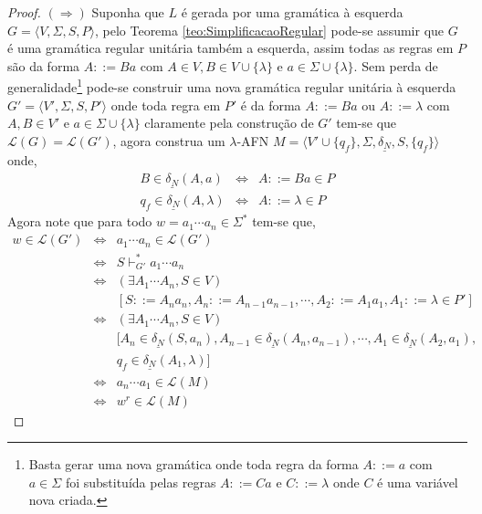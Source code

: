 \begin{proof}
	$(\Rightarrow)$ Suponha que $L$ é gerada por uma gramática à esquerda $G = \langle V, \Sigma, S, P \rangle$, pelo Teorema \ref{teo:SimplificacaoRegular} pode-se assumir que $G$ é uma gramática regular unitária também a esquerda, assim todas as regras em $P$ são da forma $A ::= Ba$ com $A \in V, B \in V \cup \{\lambda\}$ e $a \in \Sigma \cup \{\lambda\}$. Sem perda de generalidade\footnote{Basta gerar uma nova gramática onde toda regra da forma $A ::= a$ com $a \in \Sigma$ foi substituída pelas regras $A ::= Ca$ e $C ::= \lambda$ onde $C$ é uma variável nova criada.} pode-se construir uma nova gramática regular unitária à esquerda $G' = \langle V', \Sigma, S, P'\rangle$ onde toda regra em $P'$ é da forma $A ::= Ba$ ou $A ::= \lambda$ com $A, B \in V'$ e $a \in \Sigma \cup \{\lambda\}$ claramente pela construção de $G'$ tem-se que $\mathcal{L}(G) = \mathcal{L}(G')$, agora construa um $\lambda$-AFN $M = \langle V' \cup \{q_f\}, \Sigma, \underline{\delta_N}, S, \{q_f\} \rangle$ onde, 
	\begin{eqnarray*}
		B \in \underline{\delta_N}(A, a) & \Longleftrightarrow & A ::= Ba \in P\\
		q_f \in \underline{\delta_N}(A, \lambda)& \Longleftrightarrow & A ::= \lambda \in P
	\end{eqnarray*} 
	Agora note que para todo $w = a_1\cdots a_n \in \Sigma^*$ tem-se que,
	\begin{eqnarray*}
		w \in \mathcal{L}(G') & \Longleftrightarrow &  a_1\cdots a_n \in \mathcal{L}(G')\\
		& \Longleftrightarrow & S \vdash_{G'}^* a_1\cdots a_n\\
		& \Longleftrightarrow & (\exists A_1 \cdots A_n, S \in V)\\
		& & [S ::= A_na_n, A_n ::= A_{n-1}a_{n-1}, \cdots, A_{2} ::= A_1a_1, A_1 ::= \lambda \in P']\\
		& \Longleftrightarrow & (\exists A_1 \cdots A_n, S \in V)\\
		& & [A_n \in \underline{\delta_N}(S, a_n), A_{n-1} \in \underline{\delta_N}(A_n, a_{n-1}), \cdots,  A_{1} \in \underline{\delta_N}(A_2, a_{1}), \\
		& &  q_f \in \underline{\delta_N}(A_1, \lambda)]\\
		& \Longleftrightarrow & a_n\cdots a_1 \in \mathcal{L}(M)\\
		& \Longleftrightarrow & w^r \in \mathcal{L}(M)
	\end{eqnarray*}

\end{proof}
